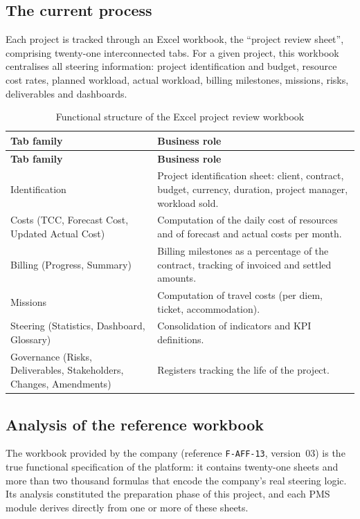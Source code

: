\subsection{The current process}
Each project is tracked through an Excel workbook, the ``project review sheet'', comprising
twenty-one interconnected tabs. For a given project, this workbook centralises all steering
information: project identification and budget, resource cost rates, planned workload, actual
workload, billing milestones, missions, risks, deliverables and dashboards.

\begin{longtable}{|m{4.5cm}|m{10.5cm}|}
\caption{Functional structure of the Excel project review workbook}\label{tab:excel-structure}\\
\hline
\textbf{Tab family} & \textbf{Business role} \\
\hline
\endfirsthead
\hline
\textbf{Tab family} & \textbf{Business role} \\
\hline
\endhead
\endfoot
\endlastfoot
\hline
Identification & Project identification sheet: client, contract, budget, currency, duration,
project manager, workload sold. \\
\hline
Costs (TCC, Forecast Cost, Updated Actual Cost) & Computation of the daily cost of resources and of
forecast and actual costs per month. \\
\hline
Billing (Progress, Summary) & Billing milestones as a percentage of the contract, tracking of
invoiced and settled amounts. \\
\hline
Missions & Computation of travel costs (per diem, ticket, accommodation). \\
\hline
Steering (Statistics, Dashboard, Glossary) & Consolidation of indicators and KPI definitions. \\
\hline
Governance (Risks, Deliverables, Stakeholders, Changes, Amendments) & Registers tracking the life
of the project. \\
\hline
\end{longtable}

\subsection{Analysis of the reference workbook}
The workbook provided by the company (reference \texttt{F-AFF-13}, version~03) is the true
functional specification of the platform: it contains twenty-one sheets and more than two thousand
formulas that encode the company's real steering logic. Its analysis constituted the preparation
phase of this project, and each PMS module derives directly from one or more of these sheets.

